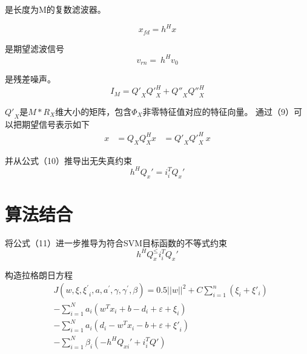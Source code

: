 是长度为M的复数滤波器。

\begin{equation}
x_{fd}= h^Hx
\end{equation}

是期望滤波信号
\begin{equation}
v_{rn}=\ h^Hv_0
\end{equation}

是残差噪声。
\begin{equation}
I_M={Q'}_X{Q'}_X^H+{Q''}_X{Q''}_X^H
\end{equation}

${Q'}_X$是$M*R_X$维大小的矩阵，包含$\Phi_X$非零特征值对应的特征向量。
通过（9）可以把期望信号表示如下
\begin{equation}
\begin{aligned}
x&=Q_XQ_X^Hx
&={Q'}_X{Q'}_X^H\ x
\end{aligned}
\end{equation}

并从公式（10）推导出无失真约束
\begin{equation}
h^HQ_x'=i_i^TQ_x'
\end{equation}

\section{算法结合}
将公式（11）进一步推导为符合SVM目标函数的不等式约束
\begin{equation}
h^HQ_x^\le i_i^TQ_x'
\end{equation}

构造拉格朗日方程
\begin{equation}
\begin{aligned}
&J\left(w,\xi,{\xi^\prime}_i,a,a^\prime,\gamma,\gamma^\prime,\beta\right)=0.5||w||^2+C\sum\limits_{i=1}^{n}(\xi_i +\xi'_i)\\
&-\sum_{i=1}^{N}{a_i\left(w^Tx_i+b-d_i+\varepsilon+\xi_i\right)}\\
&-\sum_{i=1}^{N}{a_i\left(d_i-w^Tx_i-b+\varepsilon+{\xi'}_i\right)}\\
&-\sum_{i=1}^{N}{\beta_i\left(-h^HQ_{xi}'+i_i^TQ'\right)}
\end{aligned}
\end{equation}


